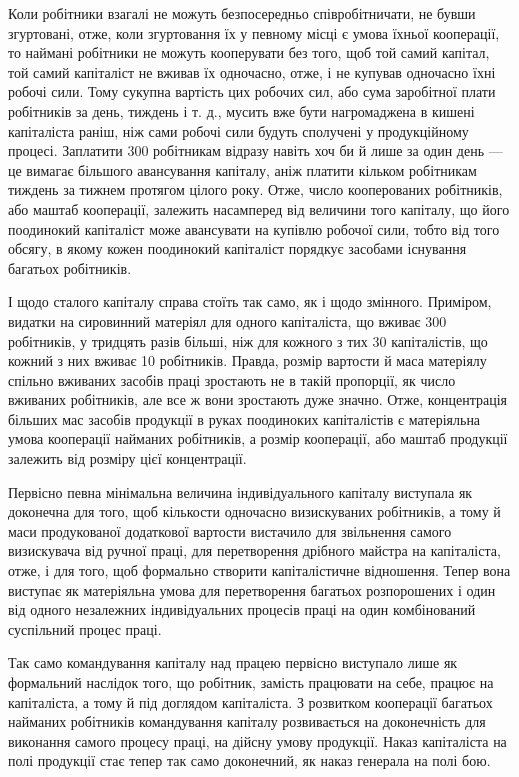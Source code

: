 
Коли робітники взагалі не можуть безпосередньо співробітничати,
не бувши згуртовані, отже, коли згуртовання їх у певному
місці є умова їхньої кооперації, то наймані робітники не можуть
кооперувати без того, щоб той самий капітал, той самий капіталіст
не вживав їх одночасно, отже, і не купував одночасно їхні робочі
сили. Тому сукупна вартість цих робочих сил, або сума заробітної
плати робітників за день, тиждень і т. д., мусить вже бути нагромаджена
в кишені капіталіста раніш, ніж сами робочі сили будуть
сполучені у продукційному процесі. Заплатити 300 робітникам
відразу навіть хоч би й лише за один день — це вимагає
більшого авансування капіталу, аніж платити кільком робітникам
тиждень за тижнем протягом цілого року. Отже, число
кооперованих робітників, або маштаб кооперації, залежить насамперед
від величини того капіталу, що його поодинокий капіталіст
може авансувати на купівлю робочої сили, тобто від того обсягу,
в якому кожен поодинокий капіталіст порядкує засобами
існування багатьох робітників.

І щодо сталого капіталу справа стоїть так само, як і щодо
змінного. Приміром, видатки на сировинний матеріял для одного
капіталіста, що вживає 300 робітників, у тридцять разів більші,
ніж для кожного з тих 30 капіталістів, що кожний з них вживає
10 робітників. Правда, розмір вартости й маса матеріялу спільно
вживаних засобів праці зростають не в такій пропорції, як число
вживаних робітників, але все ж вони зростають дуже значно.
Отже, концентрація більших мас засобів продукції в руках поодиноких
капіталістів є матеріяльна умова кооперації найманих
робітників, а розмір кооперації, або маштаб продукції залежить
від розміру цієї концентрації.

Первісно певна мінімальна величина індивідуального капіталу
виступала як доконечна для того, щоб кількости одночасно
визискуваних робітників, а тому й маси продукованої додаткової
вартости вистачило для звільнення самого визискувача від ручної
праці, для перетворення дрібного майстра на капіталіста, отже,
і для того, щоб формально створити капіталістичне відношення.
Тепер вона виступає як матеріяльна умова для перетворення
багатьох розпорошених і один від одного незалежних індивідуальних
процесів праці на один комбінований суспільний процес
праці.

Так само командування капіталу над працею первісно виступало
лише як формальний наслідок того, що робітник, замість
працювати на себе, працює на капіталіста, а тому й під доглядом
капіталіста. З розвитком кооперації багатьох найманих робітників
командування капіталу розвивається на доконечність для
виконання самого процесу праці, на дійсну умову продукції.
Наказ капіталіста на полі продукції стає тепер так само доконечний,
як наказ генерала на полі бою.

